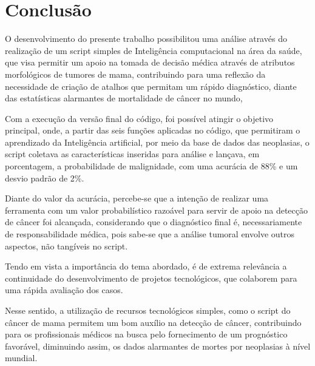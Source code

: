 \chapter{Conclusão}
\label{chapter:conclusao}

O desenvolvimento do presente trabalho possibilitou uma análise através do realização de um script simples de Inteligência computacional na área da saúde, que visa permitir um apoio na tomada de decisão médica através de atributos morfológicos de tumores de mama, contribuindo para uma reflexão da necessidade de criação de atalhos que permitam um rápido diagnóstico, diante das estatísticas alarmantes de mortalidade de câncer no mundo, 

Com a execução da versão final do código, foi possível atingir o objetivo principal, onde, a partir das seis funções aplicadas no código, que permitiram o aprendizado da Inteligência artificial, por meio da base de dados das neoplasias, o script coletava as características inseridas para análise e lançava, em porcentagem, a probabilidade de malignidade, com uma acurácia de 88\% e um desvio padrão de 2\%.

Diante do valor da acurácia, percebe-se que a intenção de realizar uma ferramenta com um valor probabilístico razoável para servir de apoio na detecção de câncer foi alcançada, considerando que o diagnóstico final é, necessariamente de responsabilidade médica, pois sabe-se que a análise tumoral envolve outros aspectos, não tangíveis no script.

Tendo em vista a importância do tema abordado, é de extrema relevância a continuidade do desenvolvimento de projetos tecnológicos, que colaborem para uma rápida avaliação dos casos.

Nesse sentido, a utilização de recursos tecnológicos simples, como o script do câncer de mama permitem um bom auxílio na detecção de câncer, contribuindo para os profissionais médicos na busca pelo fornecimento de um prognóstico favorável, diminuindo assim, os dados alarmantes de mortes por neoplasias à nível mundial.
